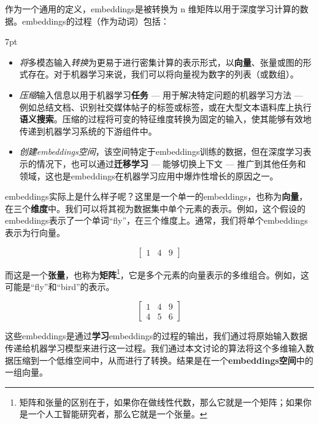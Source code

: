 \documentclass[Chinese, 11pt, table]{diazessay} %
\newenvironment{formal}{%
  \def\FrameCommand{%
	\hspace{1pt}%
	{\color{w_lightblue}\vrule width 2pt}%
	{\color{formalshade}\vrule width 4pt}%
	\colorbox{formalshade}%
  }%
  \MakeFramed{\advance\hsize-\width\FrameRestore}%
  \noindent\hspace{-4.55pt}%
  \begin{adjustwidth}{}{7pt}%
  \vspace{2pt}\vspace{2pt}%
}
{%
  \vspace{2pt}\end{adjustwidth}\endMakeFramed%
}
\begin{document}
\begin{CJK}{UTF8}{gbsn}
\begin{sloppypar}
作为一个通用的定义，embeddings是被转换为 n 维矩阵以用于深度学习计算的数据。embeddings的过程（作为动词）包括：
\begin{formal}
\begin{itemize}
   \item \emph{将}多模态输入\emph{转换}为更易于进行密集计算的表示形式，以\textbf{向量}、张量或图的形式存在\citep{rao2019natural}。对于机器学习来说，我们可以将向量视为数字的列表（或数组）。
  \item \emph{压缩}输入信息以用于机器学习\textbf{任务} --- 用于解决特定问题的机器学习方法 --- 例如总结文档、识别社交媒体帖子的标签或标签，或在大型文本语料库上执行\textbf{语义搜索}。压缩的过程将可变的特征维度转换为固定的输入，使其能够有效地传递到机器学习系统的下游组件中。
  \item \emph{创建embeddings空间}，该空间特定于embeddings训练的数据，但在深度学习表示的情况下，也可以通过\textbf{迁移学习} --- 能够切换上下文 --- 推广到其他任务和领域，这也是embeddings在机器学习应用中爆炸性增长的原因之一。
\end{itemize}
\end{formal}

embeddings实际上是什么样子呢？这里是一个单一的embeddings，也称为\textbf{向量}，在三个\textbf{维度}中。我们可以将其视为数据集中单个元素的表示。例如，这个假设的embeddings表示了一个单词“fly”，在三个维度上。通常，我们将单个embeddings表示为行向量。

\begin{equation}
\begin{bmatrix}
1 & 4 & 9
\end{bmatrix}
\end{equation}

而这是一个\textbf{张量}，也称为\textbf{矩阵}\footnote{矩阵和张量的区别在于，如果你在做线性代数，那么它就是一个矩阵；如果你是一个人工智能研究者，那么它就是一个张量。}，它是多个元素的向量表示的多维组合。例如，这可能是“fly”和“bird”的表示。

\begin{equation}
\begin{bmatrix}
1 & 4 & 9\\
4 & 5 & 6
\end{bmatrix}
\end{equation}

这些embeddings是通过\textbf{学习}embeddings的过程的输出，我们通过将原始输入数据传递给机器学习模型来进行这一过程。我们通过本文讨论的算法将这个多维输入数据压缩到一个低维空间中，从而进行了转换。结果是在一个\textbf{embeddings空间}中的一组向量。


\end{sloppypar}
\end{CJK}
\end{document}
